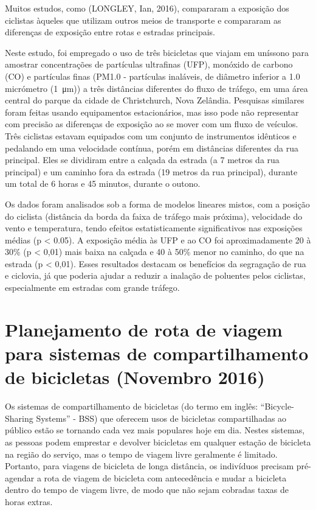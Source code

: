 Muitos estudos, como (LONGLEY, Ian, 2016), compararam a exposição dos ciclistas àqueles que utilizam 
outros meios de transporte e compararam as diferenças de exposição entre rotas e estradas principais. 

Neste estudo, foi empregado o uso de três bicicletas que viajam em uníssono para amostrar 
concentrações de partículas ultrafinas (UFP), monóxido de carbono (CO) e partículas finas (PM1.0 - 
partículas inaláveis, de diâmetro inferior a 1.0 micrómetro (\SI{1}{ \micro\meter })) a três 
distâncias diferentes do fluxo de tráfego, em uma área central do parque da cidade de Christchurch, 
Nova Zelândia. Pesquisas similares foram feitas usando equipamentos estacionários, mas isso pode não 
representar com precisão as diferenças de exposição ao se mover com um fluxo de veículos. Três 
ciclistas estavam equipados com um conjunto de instrumentos idênticos e pedalando em uma velocidade 
contínua, porém em distâncias diferentes da rua principal. Eles se dividiram entre a calçada da 
estrada (a 7 metros da rua principal) e um caminho fora da estrada (19 metros da rua principal), 
durante um total de 6 horas e 45 minutos, durante o outono. 

Os dados foram analisados sob a forma de modelos lineares mistos, com a posição do ciclista 
(distância da borda da faixa de tráfego mais próxima), velocidade do vento e temperatura, tendo 
efeitos estatisticamente significativos nas exposições médias (p < 0.05). A exposição média às UFP e 
ao CO foi aproximadamente 20 à 30\% (p < 0,01) mais baixa na calçada e 40 à 50\% menor no caminho, 
do que na estrada (p < 0,01). Esses resultados destacam os benefícios da segragação de rua e 
ciclovia, já que poderia ajudar a reduzir a inalação de poluentes pelos ciclistas, especialmente em 
estradas com grande tráfego.

\section{Planejamento de rota de viagem para sistemas de compartilhamento de bicicletas (Novembro 
2016)}

Os sistemas de compartilhamento de bicicletas (do termo em inglês: ``Bicycle-Sharing Systems'' - BSS) 
que oferecem usos de bicicletas compartilhadas ao público estão se tornando cada vez mais populares 
hoje em dia. Nestes sistemas, as pessoas podem emprestar e devolver bicicletas em qualquer estação 
de bicicleta na região do serviço, mas o tempo de viagem livre geralmente é limitado. Portanto, para 
viagens de bicicleta de longa distância, os indivíduos precisam pré-agendar a rota de viagem de 
bicicleta com antecedência e mudar a bicicleta dentro do tempo de viagem livre, de modo que não sejam 
cobradas taxas de horas extras. 


